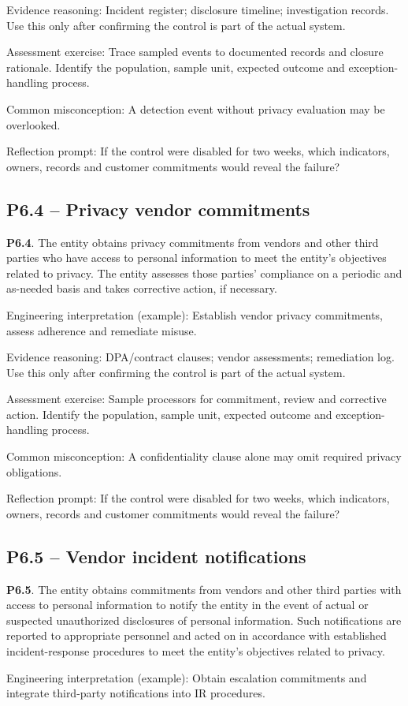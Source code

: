 \documentclass[10pt,oneside]{report}
\begin{document}
Evidence reasoning: Incident register; disclosure timeline; investigation records. Use this only after confirming the control is part of the actual system.

Assessment exercise: Trace sampled events to documented records and closure rationale. Identify the population, sample unit, expected outcome and exception-handling process.

Common misconception: A detection event without privacy evaluation may be overlooked.

Reflection prompt: If the control were disabled for two weeks, which indicators, owners, records and customer commitments would reveal the failure?

\subsection{P6.4 -- Privacy vendor commitments}
\begin{aicpabox}
\textbf{P6.4}. The entity obtains privacy commitments from vendors and other third parties who have access to personal information to meet the entity's objectives related to privacy. The entity assesses those parties' compliance on a periodic and as-needed basis and takes corrective action, if necessary.\par{}
\end{aicpabox}
Engineering interpretation (example): Establish vendor privacy commitments, assess adherence and remediate misuse.

Evidence reasoning: DPA/contract clauses; vendor assessments; remediation log. Use this only after confirming the control is part of the actual system.

Assessment exercise: Sample processors for commitment, review and corrective action. Identify the population, sample unit, expected outcome and exception-handling process.

Common misconception: A confidentiality clause alone may omit required privacy obligations.

Reflection prompt: If the control were disabled for two weeks, which indicators, owners, records and customer commitments would reveal the failure?

\subsection{P6.5 -- Vendor incident notifications}
\begin{aicpabox}
\textbf{P6.5}. The entity obtains commitments from vendors and other third parties with access to personal information to notify the entity in the event of actual or suspected unauthorized disclosures of personal information. Such notifications are reported to appropriate personnel and acted on in accordance with established incident-response procedures to meet the entity's objectives related to privacy.\par{}
\end{aicpabox}
Engineering interpretation (example): Obtain escalation commitments and integrate third-party notifications into IR procedures.
\end{document}
